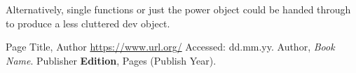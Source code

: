\documentclass[a4paper,12pt, notitlepage]{article}
\begin{document}
Alternatively, single functions or just the power object could be handed through to produce a less cluttered dev object. 

\small{
\begin{thebibliography}{99}

\setlength{\itemsep}{-2mm}

 Page Title,
                  Author {\url{https://www.url.org/}} {Accessed: dd.mm.yy}.
 Author, 
                  {\em Book Name}. Publisher {\bf Edition}, Pages (Publish Year).

\end{thebibliography}
}
\end{document}
